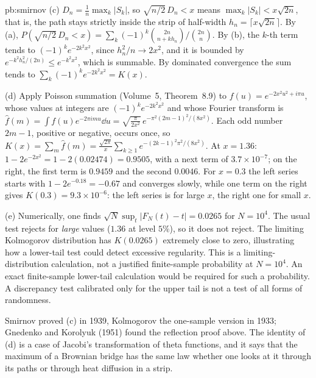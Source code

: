 \begin{solution}{pb:smirnov}
(c) $D_n=\frac1n\max_k|S_k|$, so $\sqrt{n/2}\,D_n<x$ means $\max_k|S_k|<x\sqrt{2n}$, that is, the path stays strictly inside the strip of half-width $h_n=\lceil x\sqrt{2n}\rceil$.
By (a), $P(\sqrt{n/2}\,D_n<x)=\sum_k(-1)^k\binom{2n}{n+kh_n}\big/\binom{2n}n$. By (b), the $k$-th term tends to $(-1)^ke^{-2k^2x^2}$, since $h_n^2/n\to2x^2$, and it is bounded by
$e^{-k^2h_n^2/(2n)}\le e^{-k^2x^2}$, which is summable. By dominated convergence the sum tends to $\sum_k(-1)^ke^{-2k^2x^2}=K(x)$.

(d) Apply Poisson summation (Volume~5, Theorem~8.9) to $f(u)=e^{-2x^2u^2+i\pi u}$, whose values at integers are $(-1)^ke^{-2k^2x^2}$ and whose Fourier transform is
$\hat f(m)=\int f(u)e^{-2\pi imu}\dd u=\sqrt{\frac\pi{2x^2}}\,e^{-\pi^2(2m-1)^2/(8x^2)}$. Each odd number $2m-1$, positive or negative, occurs once, so
$K(x)=\sum_m\hat f(m)=\frac{\sqrt{2\pi}}x\sum_{k\ge1}e^{-(2k-1)^2\pi^2/(8x^2)}$. At $x=1.36$: $1-2e^{-2x^2}=1-2(0.02474)=0.9505$, with a next term of $3.7\times10^{-7}$; on the
right, the first term is $0.9459$ and the second $0.0046$. For $x=0.3$ the left series starts with $1-2e^{-0.18}=-0.67$ and converges slowly, while one term on the right gives
$K(0.3)=9.3\times10^{-6}$: the left series is for large $x$, the right one for small $x$.

(e) Numerically, one finds $\sqrt N\sup_t|F_N(t)-t|=0.0265$ for $N=10^4$. The usual test rejects for \emph{large} values ($1.36$ at level $5\%$), so it does not reject. The limiting Kolmogorov distribution has $K(0.0265)$ extremely close to zero, illustrating how a lower-tail test could detect excessive regularity. This is a limiting-distribution calculation, not a justified finite-sample probability at $N=10^4$. An exact finite-sample lower-tail calculation would be required for such a probability. A discrepancy test calibrated only for the upper tail is not a test of all forms of randomness.

\leads Smirnov proved (c) in 1939, Kolmogorov the one-sample version in 1933; Gnedenko and Korolyuk (1951) found the reflection proof above. The identity of (d) is a
case of Jacobi's transformation of theta functions, and it says that the maximum of a Brownian bridge has the same law whether one looks at it through its
paths or through heat diffusion in a strip.
\end{solution}

